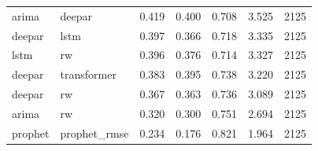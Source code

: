 \begin{table}
\begin{tabular}{llrrrrr}
arima & deepar & 0.419 & 0.400 & 0.708 & 3.525 & 2125 \\
deepar & lstm & 0.397 & 0.366 & 0.718 & 3.335 & 2125 \\
lstm & rw & 0.396 & 0.376 & 0.714 & 3.327 & 2125 \\
deepar & transformer & 0.383 & 0.395 & 0.738 & 3.220 & 2125 \\
deepar & rw & 0.367 & 0.363 & 0.736 & 3.089 & 2125 \\
arima & rw & 0.320 & 0.300 & 0.751 & 2.694 & 2125 \\
prophet & prophet\_rmse & 0.234 & 0.176 & 0.821 & 1.964 & 2125 \\
\bottomrule
\end{tabular}
\end{table}
